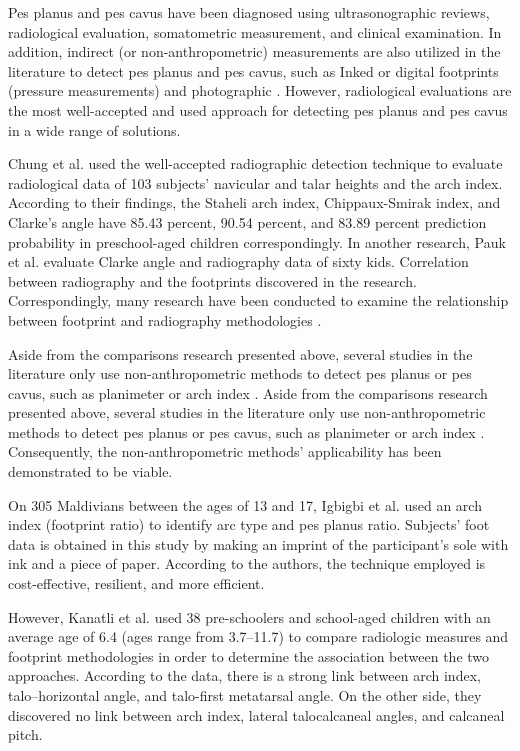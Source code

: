 Pes planus and pes cavus have been diagnosed using ultrasonographic reviews, radiological evaluation, somatometric measurement, and clinical examination. In addition, indirect (or non-anthropometric) measurements are also utilized in the literature to detect pes planus and pes cavus, such as Inked or digital footprints (pressure measurements) and photographic \cite{gun2012pes, yalccin2010medial}. However, radiological evaluations \cite{Smith1997PrevalenceOR, Winfeld2019ManagementOP} are the most well-accepted and used approach for detecting pes planus and pes cavus in a wide range of solutions.

Chung et al. \cite{Chen2010FootprintAO} used the well-accepted radiographic detection technique to evaluate radiological data of 103 subjects' navicular and talar heights and the arch index. According to their findings, the Staheli arch index, Chippaux-Smirak index, and Clarke's angle have 85.43 percent, 90.54 percent, and 83.89 percent prediction probability in preschool-aged children correspondingly. In another research, Pauk et al. \cite{Pauk2014AssessingPP} evaluate Clarke angle and radiography data of sixty kids. Correlation between radiography and the footprints discovered in the research. Correspondingly, many research have been conducted to examine the relationship between footprint and radiography methodologies \cite{Kanatl2001FootprintAR, Yaln2010EvaluationOT, menz2005validity}.

Aside from the comparisons research presented above, several studies in the literature only use non-anthropometric methods to detect pes planus or pes cavus, such as planimeter \cite{Didia1987TheUO} or arch index \cite{Cavanagh1987TheAI, Igbigbi2002TheFR}. Aside from the comparisons research presented above, several studies in the literature only use non-anthropometric methods to detect pes planus or pes cavus, such as planimeter \cite{Didia1987TheUO} or arch index \cite{Cavanagh1987TheAI, Igbigbi2002TheFR}. Consequently, the non-anthropometric methods' applicability has been demonstrated to be viable.

On 305 Maldivians between the ages of 13 and 17, Igbigbi et al. \cite{Igbigbi2002TheFR} used an arch index (footprint ratio) to identify arc type and pes planus ratio. Subjects' foot data is obtained in this study by making an imprint of the participant's sole with ink and a piece of paper. According to the authors, the technique employed is cost-effective, resilient, and more efficient.

However, Kanatli et al. \cite{Kanatl2001FootprintAR} used 38 pre-schoolers and school-aged children with an average age of 6.4 (ages range from 3.7–11.7) to compare radiologic measures and footprint methodologies in order to determine the association between the two approaches. According to the data, there is a strong link between arch index, talo–horizontal angle, and talo-first metatarsal angle. On the other side, they discovered no link between arch index, lateral talocalcaneal angles, and calcaneal pitch.

